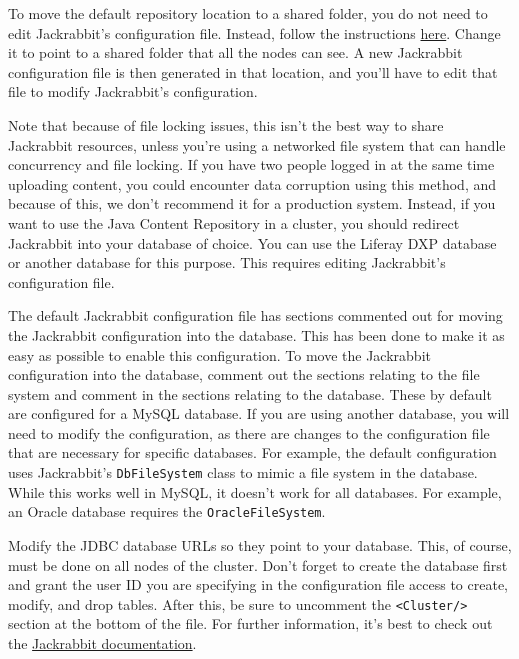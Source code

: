 To move the default repository location to a shared folder, you do not
need to edit Jackrabbit's configuration file. Instead, follow the
instructions
\href{/docs/7-0/deploy/-/knowledge_base/d/document-repository-configuration\#jcr}{here}.
Change it to point to a shared folder that all the nodes can see. A new
Jackrabbit configuration file is then generated in that location, and
you'll have to edit that file to modify Jackrabbit's configuration.

Note that because of file locking issues, this isn't the best way to
share Jackrabbit resources, unless you're using a networked file system
that can handle concurrency and file locking. If you have two people
logged in at the same time uploading content, you could encounter data
corruption using this method, and because of this, we don't recommend it
for a production system. Instead, if you want to use the Java Content
Repository in a cluster, you should redirect Jackrabbit into your
database of choice. You can use the Liferay DXP database or another
database for this purpose. This requires editing Jackrabbit's
configuration file.

The default Jackrabbit configuration file has sections commented out for
moving the Jackrabbit configuration into the database. This has been
done to make it as easy as possible to enable this configuration. To
move the Jackrabbit configuration into the database, comment out the
sections relating to the file system and comment in the sections
relating to the database. These by default are configured for a MySQL
database. If you are using another database, you will need to modify the
configuration, as there are changes to the configuration file that are
necessary for specific databases. For example, the default configuration
uses Jackrabbit's \texttt{DbFileSystem} class to mimic a file system in
the database. While this works well in MySQL, it doesn't work for all
databases. For example, an Oracle database requires the
\texttt{OracleFileSystem}.

Modify the JDBC database URLs so they point to your database. This, of
course, must be done on all nodes of the cluster. Don't forget to create
the database first and grant the user ID you are specifying in the
configuration file access to create, modify, and drop tables. After
this, be sure to uncomment the
\texttt{\textless{}Cluster/\textgreater{}} section at the bottom of the
file. For further information, it's best to check out the
\href{http://jackrabbit.apache.org}{Jackrabbit documentation}.

